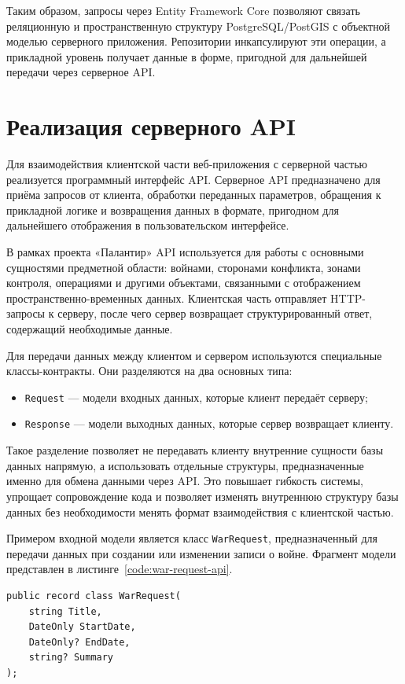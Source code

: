 Таким образом, запросы через Entity Framework Core позволяют связать реляционную и пространственную структуру PostgreSQL/PostGIS с объектной моделью серверного приложения. Репозитории инкапсулируют эти операции, а прикладной уровень получает данные в форме, пригодной для дальнейшей передачи через серверное API.

\section{Реализация серверного API}

Для взаимодействия клиентской части веб-приложения с серверной частью реализуется программный интерфейс API. Серверное API предназначено для приёма запросов от клиента, обработки переданных параметров, обращения к прикладной логике и возвращения данных в формате, пригодном для дальнейшего отображения в пользовательском интерфейсе.

В рамках проекта «Палантир» API используется для работы с основными сущностями предметной области: войнами, сторонами конфликта, зонами контроля, операциями и другими объектами, связанными с отображением пространственно-временных данных. Клиентская часть отправляет HTTP-запросы к серверу, после чего сервер возвращает структурированный ответ, содержащий необходимые данные.

Для передачи данных между клиентом и сервером используются специальные классы-контракты. Они разделяются на два основных типа:
\begin{itemize}
\item \texttt{Request} --- модели входных данных, которые клиент передаёт серверу;
\item \texttt{Response} --- модели выходных данных, которые сервер возвращает клиенту.
\end{itemize}

Такое разделение позволяет не передавать клиенту внутренние сущности базы данных напрямую, а использовать отдельные структуры, предназначенные именно для обмена данными через API. Это повышает гибкость системы, упрощает сопровождение кода и позволяет изменять внутреннюю структуру базы данных без необходимости менять формат взаимодействия с клиентской частью.

Примером входной модели является класс \texttt{WarRequest}, предназначенный для передачи данных при создании или изменении записи о войне. Фрагмент модели представлен в листинге~\ref{code:war-request-api}.

\begin{code}
\label{code:war-request-api}
\vspace{-0.75cm}
\begin{verbatim}
public record class WarRequest(
    string Title,
    DateOnly StartDate,
    DateOnly? EndDate,
    string? Summary
);
\end{verbatim}
\end{code}


